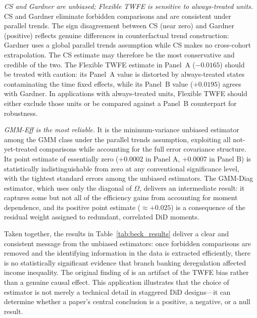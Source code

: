 \textit{CS and Gardner are unbiased; Flexible TWFE is sensitive to
always-treated units.} CS and Gardner eliminate forbidden comparisons
and are consistent under parallel trends. The sign disagreement between
CS (near zero) and Gardner (positive) reflects genuine differences in
counterfactual trend construction: Gardner uses a global parallel
trends assumption while CS makes no cross-cohort extrapolation.
The CS estimate may therefore be the most conservative and credible
of the two. The Flexible TWFE estimate in Panel~A ($-0.0165$) should
be treated with caution: its Panel~A value is distorted by
always-treated states contaminating the time fixed effects, while its
Panel~B value ($+0.0195$) agrees with Gardner. In applications with
always-treated units, Flexible TWFE should either exclude those units
or be compared against a Panel~B counterpart for robustness.

\textit{GMM-Eff is the most reliable.} It is the minimum-variance
unbiased estimator among the GMM class under the parallel trends
assumption, exploiting all not-yet-treated comparisons while
accounting for the full error covariance structure. Its point
estimate of essentially zero ($+0.0002$ in Panel A, $+0.0007$ in
Panel B) is statistically indistinguishable from zero at any
conventional significance level, with the tightest standard errors
among the unbiased estimators. The GMM-Diag estimator, which uses
only the diagonal of $\Omega$, delivers an intermediate result:
it captures some but not all of the efficiency gains from accounting
for moment dependence, and its positive point estimate ($\approx +0.025$)
is a consequence of the residual weight assigned to
redundant, correlated DiD moments.

\medskip

\noindent
Taken together, the results in Table~\ref{tab:beck_results} deliver a
clear and consistent message from the unbiased estimators: once
forbidden comparisons are removed and the identifying information in
the data is extracted efficiently, there is no statistically
significant evidence that branch banking deregulation affected income
inequality. The original finding of \citet{beck2010} is an artifact
of the TWFE bias rather than a genuine causal effect. This
application illustrates that the choice of estimator is not merely a
technical detail in staggered DiD designs---it can determine whether
a paper's central conclusion is a positive, a negative, or a null
result.
